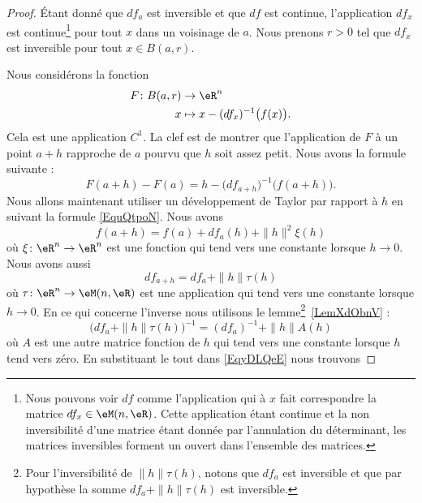 \begin{proof}
	Étant donné que \( df_a\) est inversible et que \( df\) est continue, l'application \( df_x\) est continue\footnote{Nous pouvons voir \( df\) comme l'application qui à \( x\) fait correspondre la matrice \( df_x\in\eM(n,\eR)\). Cette application étant continue et la non inversibilité d'une matrice étant donnée par l'annulation du déterminant, les matrices inversibles forment un ouvert dans l'ensemble des matrices.} pour tout \( x\) dans un voisinage de \( a\). Nous prenons \( r>0\) tel que \( df_x\) est inversible pour tout \( x\in B(a,r)\).

	Nous considérons la fonction
	\begin{equation}
		\begin{aligned}
			F\colon B(a,r) & \to \eR^n                              \\
			x              & \mapsto x-(df_x)^{-1}\big( f(x) \big).
		\end{aligned}
	\end{equation}
	Cela est une application \( C^1\). La clef est de montrer que l'application de \( F\) à un point \( a+h\) rapproche de \( a\) pourvu que \( h\) soit assez petit. Nous avons la formule suivante :
	\begin{equation}        \label{EqyDLQeE}
		F(a+h)-F(a)=h-\big( df_{a+h} \big)^{-1}\big( f(a+h) \big).
	\end{equation}
	Nous allons maintenant utiliser un développement de Taylor par rapport à \( h\) en suivant la formule \eqref{EquQtpoN}. Nous avons
	\begin{equation}
		f(a+h)=f(a)+df_a(h)+\| h \|^2\xi(h)
	\end{equation}
	où \( \xi\colon \eR^n\to \eR^n\) est une fonction qui tend vers une constante lorsque \( h\to 0\). Nous avons aussi
	\begin{equation}
		df_{a+h}=df_a+\| h \|\tau(h)
	\end{equation}
	où \( \tau\colon \eR^n\to \eM(n,\eR)\) est une application qui tend vers une constante lorsque \( h\to 0\). En ce qui concerne l'inverse nous utilisons le lemme\footnote{Pour l'inversibilité de \( \| h \|\tau(h)\), notons que \( df_a\) est inversible et que par hypothèse la somme \( df_a+\| h \|\tau(h)\) est inversible.}~\ref{LemXdObnV} :
	\begin{equation}
		\big( df_a+\| h \|\tau(h) \big)^{-1}=(df_a)^{-1}+\| h \|A(h)
	\end{equation}
	où \( A\) est une autre matrice fonction de \(h\) qui tend vers une constante lorsque \( h\) tend vers zéro. En substituant le tout dans \eqref{EqyDLQeE} nous trouvons

\end{proof}
